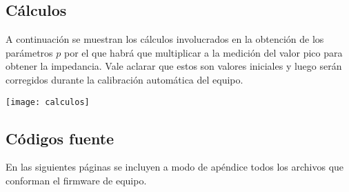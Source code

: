 \subsection{Cálculos}
A continuación se muestran los cálculos involucrados en la obtención de los parámetros $p$ por el que habrá que multiplicar a la medición del valor pico para obtener la impedancia. Vale aclarar que estos son valores iniciales y luego serán corregidos durante la calibración automática del equipo.

\hspace{-1cm}
\texttt{[image: calculos]}

\subsection{Códigos fuente}
En las siguientes páginas se incluyen a modo de apéndice todos los archivos que conforman el firmware de equipo.
